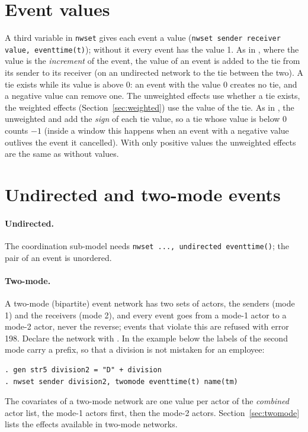 \section{Event values}\label{sec:values}

A third variable in \texttt{nwset} gives each event a value (\texttt{nwset sender receiver value, eventtime(t)}); without it every event has the value 1. As in \goldfish{}, where the value is the \emph{increment} of the event, the value of an event is added to the tie from its sender to its receiver (on an undirected network to the tie between the two). A tie exists while its value is above 0: an event with the value 0 creates no tie, and a negative value can remove one. The unweighted effects use whether a tie exists, the weighted effects (Section~\ref{sec:weighted}) use the value of the tie. As in \goldfish{}, the unweighted  and  add the \emph{sign} of each tie value, so a tie whose value is below 0 counts $-1$ (inside a window this happens when an event with a negative value outlives the event it cancelled). With only positive values the unweighted effects are the same as without values.

\section{Undirected and two-mode events}

\paragraph{Undirected.} The coordination sub-model needs \texttt{nwset ..., undirected eventtime()}; the pair of an event is unordered.

\paragraph{Two-mode.} A two-mode (bipartite) event network has two sets of actors, the senders (mode 1) and the receivers (mode 2), and every event goes from a mode-1 actor to a mode-2 actor, never the reverse; events that violate this are refused with error 198. Declare the network with . In the example below the labels of the second mode carry a prefix, so that a division is not mistaken for an employee:
\begin{lstlisting}
. gen str5 division2 = "D" + division
. nwset sender division2, twomode eventtime(t) name(tm)
\end{lstlisting}
The covariates of a two-mode network are one value per actor of the \emph{combined} actor list, the mode-1 actors first, then the mode-2 actors. Section~\ref{sec:twomode} lists the effects available in two-mode networks.

